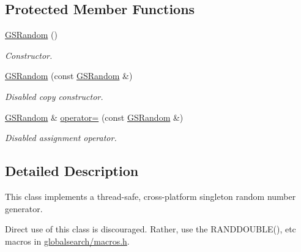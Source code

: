 \subsection*{Protected Member Functions}
\begin{DoxyCompactItemize}
\item 
\hypertarget{classGlobalSearch_1_1GSRandom_a87c1478f68605a85be05376799898185}{}\hyperlink{classGlobalSearch_1_1GSRandom_a87c1478f68605a85be05376799898185}{G\+S\+Random} ()\label{classGlobalSearch_1_1GSRandom_a87c1478f68605a85be05376799898185}

\begin{DoxyCompactList}\small\item\em Constructor. \end{DoxyCompactList}\item 
\hypertarget{classGlobalSearch_1_1GSRandom_a43fb2fb498f272c8150e59e58ca8ce37}{}\hyperlink{classGlobalSearch_1_1GSRandom_a43fb2fb498f272c8150e59e58ca8ce37}{G\+S\+Random} (const \hyperlink{classGlobalSearch_1_1GSRandom}{G\+S\+Random} \&)\label{classGlobalSearch_1_1GSRandom_a43fb2fb498f272c8150e59e58ca8ce37}

\begin{DoxyCompactList}\small\item\em Disabled copy constructor. \end{DoxyCompactList}\item 
\hypertarget{classGlobalSearch_1_1GSRandom_ac4d2afd7e581d4d3daa9def13f34f11a}{}\hyperlink{classGlobalSearch_1_1GSRandom}{G\+S\+Random} \& \hyperlink{classGlobalSearch_1_1GSRandom_ac4d2afd7e581d4d3daa9def13f34f11a}{operator=} (const \hyperlink{classGlobalSearch_1_1GSRandom}{G\+S\+Random} \&)\label{classGlobalSearch_1_1GSRandom_ac4d2afd7e581d4d3daa9def13f34f11a}

\begin{DoxyCompactList}\small\item\em Disabled assignment operator. \end{DoxyCompactList}\end{DoxyCompactItemize}


\subsection{Detailed Description}
This class implements a thread-\/safe, cross-\/platform singleton random number generator. 

Direct use of this class is discouraged. Rather, use the R\+A\+N\+D\+D\+O\+U\+B\+L\+E(), etc macros in \hyperlink{macros_8h_source}{globalsearch/macros.\+h}.

